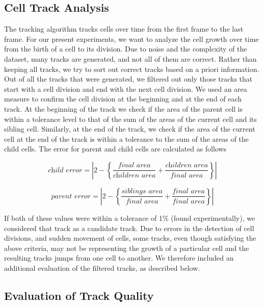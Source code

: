 \documentclass[journal]{IEEEtran}
\begin{document}
\subsection{Cell Track Analysis}

The tracking algorithm tracks cells over time from the first frame to the last frame. For our present experiments, we want to analyze the cell growth over time from the birth of a cell to its division. Due to noise and the complexity of the dataset, many tracks are generated, and not all of them are correct. Rather than keeping all tracks, we try to sort out correct tracks based on a priori information. Out of all the tracks that were generated, we filtered out only those tracks that start with a cell division and end with the next cell division. We used an area measure to confirm the cell division at the beginning and at the end of each track. At the beginning of the track we check if the area of the parent cell is within a tolerance level to that of the sum of the areas of the current cell and its sibling cell. Similarly, at the end of the track, we check if the area of the current cell at the end of the track is within a tolerance to the sum of the areas of the child cells. The error for parent and child cells are calculated as follows

\begin{equation*}
\textit{child error} = \left |2- \left \{ \frac{\textit{final area}}{\textit{children area}}+
\frac{\textit{children area}}{\textit{final area}} \right \}  \right|
\end{equation*}

\begin{equation*}
\textit{parent error} = \left |2- \left \{ \frac{\textit{siblings area}}{\textit{final area}}+
\frac{\textit{final area}}{\textit{final area}} \right \}  \right|
\end{equation*}

If both of these values were within a tolerance of 1\% (found experimentally), we considered that track as a candidate track. Due to errors in the detection of cell divisions, and sudden movement of cells, some tracks, even though satisfying the above criteria, may not be representing the growth of a particular cell and the resulting tracks jumps from one cell to another. We therefore included an additional evaluation of the filtered tracks, as described below.

\subsection{Evaluation of Track Quality}
\end{document}
